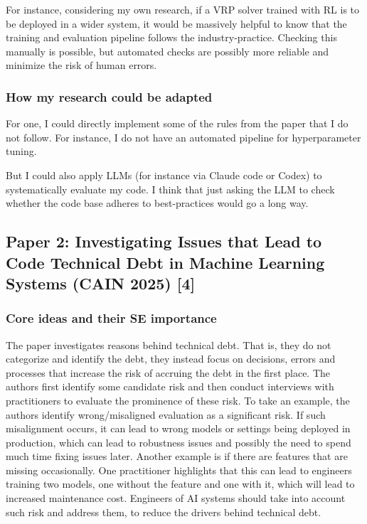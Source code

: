 \documentclass[11pt]{article}
\begin{document}
For instance, considering my own research, if a VRP solver trained with RL is to be deployed in a wider system, it would be massively helpful to know that the training and evaluation pipeline follows the industry-practice. Checking this manually is possible, but automated checks are possibly more reliable and minimize the risk of human errors. 

\subsubsection{How my research could be adapted}

For one, I could directly implement some of the rules from the paper that I do not follow. For instance, I do not have an automated pipeline for hyperparameter tuning. 

But I could also apply LLMs (for instance via Claude code or Codex) to systematically evaluate my code. I think that just asking the LLM to check whether the code base adheres to best-practices would go a long way. 

\subsection{Paper 2: Investigating Issues that Lead to Code Technical Debt in Machine Learning Systems (CAIN 2025) [4]}

\subsubsection{Core ideas and their SE importance}

The paper investigates reasons behind technical debt. That is, they do not categorize and identify the debt, they instead focus on decisions, errors and processes that increase the risk of accruing the debt in the first place. The authors first identify some candidate risk and then conduct interviews with practitioners to evaluate the prominence of these risk. To take an example, the authors identify wrong/misaligned evaluation as a significant risk. If such misalignment occurs, it can lead to wrong models or settings being deployed in production, which can lead to robustness issues and possibly the need to spend much time fixing issues later. Another example is if there are features that are missing occasionally. One practitioner highlights that this can lead to engineers training two models, one without the feature and one with it, which will lead to increased maintenance cost. Engineers of AI systems should take into account such risk and address them, to reduce the drivers behind technical debt. 
\end{document}
